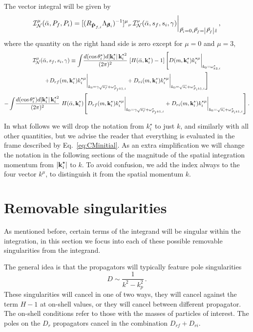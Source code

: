 \documentclass[aps,prd,onecolumn,groupedaddress]{revtex4-2}
\begin{document}
The vector integral will be given by
\begin{equation}
    \mathcal I^\mu_{\mathcal N}(\bar{\alpha}, P_f, P_i) = [(R_{\vu P_{f,i}}\Lambda_{\pmb \beta_i})^{-1}]^{\mu}{}_{\nu} \,
    \mathcal I^\nu_{\mathcal N}(\bar{\alpha}, s_f, s_i, \gamma) \bigg  |_{\vec{P}_i=0,\vec{P}_f=\abs{\vec{P}_f}\hat{z}}\,,
\end{equation}
where the quantity on the right hand side is zero except for $\mu=0$ and $\mu=3$,
\begin{multline}
\mathcal I^\mu_{\mathcal N}(\bar{\alpha}, s_f, s_i, \gamma)  \equiv  \int \! \frac{d(\cos \theta^\star_i) d\abs{\textbf k^\star_i}\, \textbf k^{\star2}_i}{(2\pi)^2} \, 
\,
 [H(\bar{\alpha}, \textbf k^\star_i) - 1]
 \,
\Bigg [ D(m, \textbf k^\star_i) k_i^{\star\mu}\bigg  |_{k_0=\omega_{k2,i}^\star} 
\\
+ D_{rf}(m, \textbf k^\star_i)  k_i^{\star\mu}\bigg  |_{k_0=\gamma\sqrt{s_f}+\omega_{P_fk1,i}^\star} +  D_{ri}(m, \textbf k^\star_i)  k_i^{\star\mu}\bigg  |_{k_0=\sqrt{s_i}+\omega_{P_i k1,i}^\star} \Bigg ]  
 \\
%
 -  \int \! \frac{d(\cos \theta^\star_i) d\abs{\textbf k^\star_i}\, \textbf k^{\star2}_i}{(2\pi)^2} \, 
 \, H(\bar{\alpha}, \textbf k^\star_i)   \qty[D_{rf}(m, \textbf k^\star_i)  k_i^{\star\mu}\bigg  |_{k_0=\gamma\sqrt{s_f}+\omega_{P_fk1,i}^\star} +  D_{ri}(m, \textbf k^\star_i)  k_i^{\star\mu}\bigg  |_{k_0=\sqrt{s_i}+\omega_{P_i k1,i}^\star}]  \,.
\end{multline}


In what follows we will drop the notation from $k^\star_i$ to just $k$, and similarly with all other quantities, but we advise the reader that everything is evaluated in the frame described by Eq.~\ref{eq:CMinitial}.
As an extra simplification we will change the notation in the following sections of the magnitude of the spatial integration momentum from $\abs{\textbf k^\star_i}$ to $k$.
To avoid confusion, we add the index always to the four vector $k^\mu$, to distinguish it from the spatial momentum $k$.

\section{Removable singularities}

As mentioned before, certain terms of the integrand will be singular within the integration, in this section we focus into each of these possible removable singularities from the integrand.

The general idea is that the propagators will typically feature pole singularities
\begin{equation}
    D \sim \frac{1}{k^2-k^2_p}\,.
\end{equation}
These singularities will cancel in one of two ways, they will cancel against the term $H-1$ at on-shell values, or they will cancel between different propagator.
The on-shell conditions refer to those with the masses of particles of interest.
The poles on the $D_r$ propagators cancel in the combination $D_{rf}+D_{ri}$.
\end{document}
